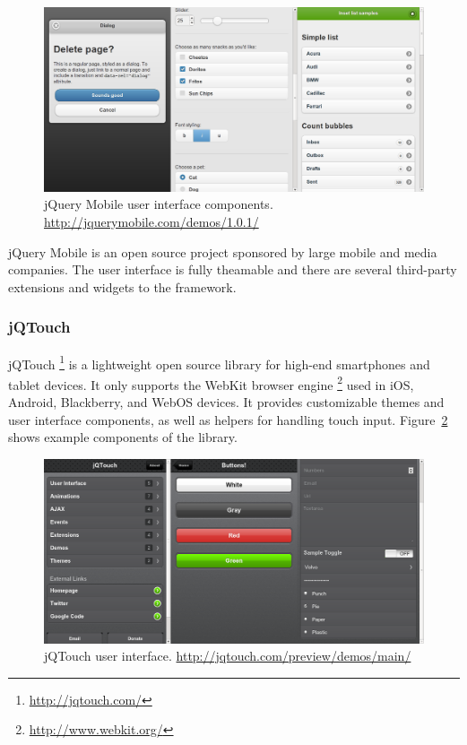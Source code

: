\begin{figure}[ht]
  \begin{center}
    \includegraphics[width=\textwidth]{images/jquerymobile.png}
    \caption{jQuery Mobile user interface
      components. \url{http://jquerymobile.com/demos/1.0.1/}}
    \label{figure:jquerymobile.png}
  \end{center}
\end{figure}

jQuery Mobile is an open source project sponsored by large mobile and
media companies. The user interface is fully theamable and there are
several third-party extensions and widgets to the framework.

\subsubsection{jQTouch}

jQTouch \footnote{\url{http://jqtouch.com/}} is a lightweight open
source library for high-end smartphones and tablet devices. It only
supports the WebKit browser
engine \footnote{\url{http://www.webkit.org/}} used in iOS, Android,
Blackberry, and WebOS devices. It provides customizable themes and
user interface components, as well as helpers for handling touch
input. Figure~\ref{figure:jqtouch.png} shows example components of the
library.

\begin{figure}[ht]
  \begin{center}
    \includegraphics[width=\textwidth]{images/jqtouch.png}
    \caption{jQTouch user
      interface. \url{http://jqtouch.com/preview/demos/main/}}
    \label{figure:jqtouch.png}
  \end{center}
\end{figure}

